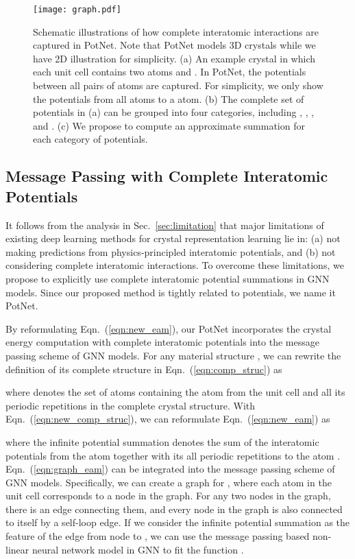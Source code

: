 \documentclass[nohyperref]{article}
\theoremstyle{plain}
\theoremstyle{definition}
\theoremstyle{remark}
\begin{document}
\begin{figure*}[t]
    \centering
    \texttt{[image: graph.pdf]}
    \vskip -0.1in
    \caption{
    Schematic illustrations of how complete interatomic interactions are captured in PotNet. Note that PotNet models 3D crystals while we have 2D illustration for simplicity. (a) An example crystal in which each unit cell contains two atoms  and . In PotNet, the potentials between all pairs of atoms are captured. For simplicity, we only show the potentials from all  atoms to a  atom. (b) The complete set of potentials in (a) can be grouped into four categories, including , , , and . (c) We propose to compute an approximate summation for each category of potentials. 
    }
    \label{fig:infinite}
\vspace{-0.4cm}\end{figure*}

\subsection{Message Passing with Complete Interatomic Potentials}
\label{icg}

It follows from the analysis in Sec.~\ref{sec:limitation} that major limitations of existing deep learning methods for crystal representation learning lie in: (a) not making predictions from physics-principled interatomic potentials, and (b) not considering complete interatomic interactions. To overcome these limitations, we propose to explicitly use complete interatomic potential summations in GNN models. Since our proposed method is tightly related to potentials, we name it PotNet.

By reformulating Eqn.~(\ref{eqn:new_eam}), our PotNet incorporates the crystal energy computation with complete interatomic potentials into the message passing scheme of GNN models. For any material structure , we can rewrite the definition of its complete structure  in Eqn.~(\ref{eqn:comp_struc}) as    

where  denotes the set of atoms containing the atom  from the unit cell  and all its periodic repetitions in the complete crystal structure. With Eqn.~(\ref{eqn:new_comp_struc}), we can reformulate Eqn.~(\ref{eqn:new_eam}) as

where the infinite potential summation  denotes the sum of the interatomic potentials from the atom  together with its all periodic repetitions to the atom . Eqn.~(\ref{eqn:graph_eam}) can be integrated into the message passing scheme of GNN models. Specifically, we can create a graph  for , where each atom in the unit cell  corresponds to a node in the graph. For any two nodes  in the graph, there is an edge connecting them, and every node  in the graph is also connected to itself by a self-loop edge. If we consider the infinite potential summation  as the feature of the edge from node  to , we can use the message passing based non-linear neural network model in GNN to fit the function .
\end{document}
